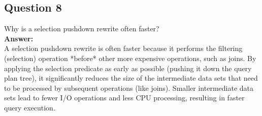 \documentclass{article}
\begin{document}
\subsection*{Question 8}

Why is a selection pushdown rewrite often faster?\\

\textbf{Answer:}\\

A selection pushdown rewrite is often faster because it performs the filtering (selection) operation *before* other more expensive operations, such as joins. By applying the selection predicate as early as possible (pushing it down the query plan tree), it significantly reduces the size of the intermediate data sets that need to be processed by subsequent operations (like joins). Smaller intermediate data sets lead to fewer I/O operations and less CPU processing, resulting in faster query execution.\\
\end{document}
